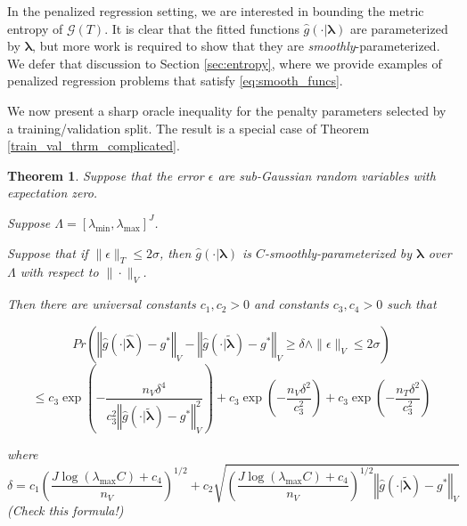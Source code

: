 \documentclass[12pt]{article}
\newtheorem{theorem}{Theorem}
\begin{document}
In the penalized regression setting, we are interested in bounding the metric entropy of $\mathcal{G}(T)$. It is clear that the fitted functions $\hat{g}(\cdot | \boldsymbol \lambda)$ are parameterized by $\boldsymbol \lambda$, but more work is required to show that they are \textit{smoothly}-parameterized. We defer that discussion to Section \ref{sec:entropy}, where we provide examples of penalized regression problems that satisfy \ref{eq:smooth_funcs}.

We now present a sharp oracle inequality for the penalty parameters selected by a training/validation split. The result is a special case of Theorem \ref{train_val_thrm_complicated}.





\begin{theorem}
\label{train_val_thrm}
Suppose that the error $\epsilon$ are sub-Gaussian random variables with expectation zero.

Suppose $\Lambda=[\lambda_{\min},\lambda_{\max}]^{J}$.

Suppose that if $\|\epsilon\|_{T}\le 2\sigma$, then $\hat g (\cdot |\boldsymbol{\lambda} )$ is $C$-smoothly-parameterized by $\boldsymbol{\lambda}$ over $\Lambda$ with respect to $\| \cdot \|_V$.


Then there are universal constants $c_{1},c_{2}>0$ and constants
$c_{3},c_{4}>0$ such that

$$
	Pr\left(\left\Vert \hat{g}(\cdot|\hat{\boldsymbol{\lambda}})-g^{*}\right\Vert _{V}-\left\Vert \hat{g}(\cdot|\tilde{\boldsymbol{\lambda}})-g^{*}\right\Vert _{V}\ge\delta\wedge\|\epsilon\|_{V}\le2\sigma\right)
$$
$$
	\le c_{3}\exp\left(-\frac{n_{V}\delta^{4}}{c_{3}^{2}\left\Vert \hat{g}(\cdot|\tilde{\boldsymbol{\lambda}})-g^{*}\right\Vert _{V}^{2}}\right)
	+c_{3}\exp\left(-\frac{n_{V}\delta^{2}}{c_{3}^{2}}\right)
	+c_{3}\exp\left(-\frac{n_{T}\delta^{2}}{c_{3}^{2}}\right)
$$


where 
\[
\delta = c_1 \left(
	\frac{
		J \log (\lambda_{\max}C)+c_{4}
	}{n_V}
\right)^{1/2}+c_{2}
\sqrt{\left(
	\frac{
		J\log(\lambda_{\max}C)+c_{4}
	}{n_{V}}
\right)^{1/2}
\left\Vert \hat{g}(\cdot|\tilde{\boldsymbol{\lambda}})-g^{*}\right\Vert _{V}}
\] (Check this formula!)
\end{theorem}
\end{document}
